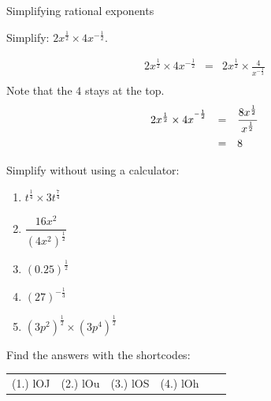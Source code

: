 \begin{wex}
{%
Simplifying rational exponents
}

{
Simplify:
$ 2x^{\frac{1}{2}}\times 4x^{-\frac{1}{2}}. $
}
{%
\begin{eqnarray*}
 2x^{\frac{1}{2}} \times 4x^{-\frac{1}{2}} & = & 2x^{\frac{1}{2}} \times \frac{4}{x^{-\frac{1}{2}}} \\
\end{eqnarray*}
Note that the $4$ stays at the top.\\

\begin{equation*}
 \begin{array}{rcl}
 2x^{\frac{1}{2}} \times 4x^{^{-\frac{1}{2}}} & = & \dfrac{8x^{\frac{1}{2}}}{x^{\frac{1}{2}}} \vspace{5pt} \\
					     & = & 8 
 \end{array}

\end{equation*}




}
\end{wex}

\begin{exercises}{}{
Simplify without using a calculator:
\begin{multicols}{2}
\begin{enumerate}[label=\textbf{\arabic*}., itemsep=5pt]
 \item $ t^{\frac{1}{4}} \times 3t^{\frac{7}{4}} $
 \item $ \dfrac{16x^2}{(4x^2)^{\frac{1}{2}}} $
 \item $ (0.25)^{\frac{1}{2}} $
 \item $ (27)^{-\frac{1}{3}} $
 \item $ (3p^2)^{\frac{1}{2}} \times (3p^4)^{\frac{1}{2}} $
\end{enumerate}
\end{multicols}
\practiceinfo
{} Find the answers with the shortcodes:
\begin{tabular}[h]{cccccc}
(1.) lOJ  &  (2.) lOu  &  (3.) lOS  &  (4.) lOh  & 
\end{tabular}
}
\end{exercises}




